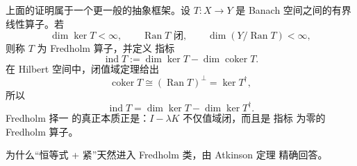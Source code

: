 上面的证明属于一个更一般的抽象框架。设 $T:X\to Y$ 是 Banach 空间之间的有界线性算子。若
\begin{equation*}\dim\ker T<\infty,
\qquad
\operatorname{Ran}T\text{ 闭},
\qquad
\dim(Y/\operatorname{Ran}T)<\infty,\end{equation*}
则称 $T$ 为 Fredholm 算子，并定义 指标
\begin{equation*}{
\operatorname{ind}T
:=\dim\ker T-\dim\operatorname{coker}T.
}\end{equation*}
在 Hilbert 空间中，闭值域定理给出
\[
\operatorname{coker}T
\cong(\operatorname{Ran}T)^\perp
=\ker T^\dagger,
\]
所以
\begin{equation*}\operatorname{ind}T
=\dim\ker T-\dim\ker T^\dagger.\end{equation*}
Fredholm 择一 的真正本质正是：$I-\lambda K$ 不仅值域闭，而且是 指标 为零的 Fredholm 算子。

为什么“恒等式 + 紧”天然进入 Fredholm 类，由 Atkinson 定理 精确回答。



